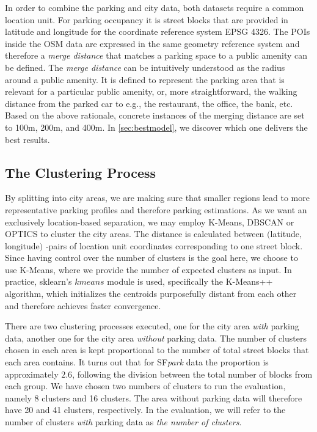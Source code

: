	In order to combine the parking and city data, both datasets require a common location unit. For parking occupancy it is street blocks that are provided in latitude and longitude for the coordinate reference system EPSG 4326. The POIs inside the OSM data are expressed in the same geometry reference system and therefore a \textit{merge distance} that matches a parking space to a public amenity can be defined. The \textit{merge distance} can be intuitively understood as the radius around a public amenity. It is defined to represent the parking area that is relevant for a particular public amenity, or, more straightforward, the walking distance from the parked car to e.g., the restaurant, the office, the bank, etc. Based on the above rationale, concrete instances of the merging distance are set to 100m, 200m, and 400m. In \cref{sec:bestmodel}, we discover which one delivers the best results.
	
	
	\subsection{The Clustering Process}
	By splitting into city areas, we are making sure that smaller regions lead to more representative parking profiles and therefore parking estimations. As we want an exclusively location-based separation, we may employ K-Means, DBSCAN or OPTICS to cluster the city areas. The distance is calculated between $($latitude$,$ longitude$)$ -pairs of location unit coordinates corresponding to one street block. Since having control over the number of clusters is the goal here, we choose to use K-Means, where we provide the number of expected clusters as input.  In practice, sklearn's $kmeans$ module is used, specifically the K-Means++ algorithm, which initializes the centroids purposefully distant from each other and therefore achieves faster convergence.
	
	There are two clustering processes executed, one for the city area \textit{with} parking data, another one for the city area \textit{without} parking data. The number of clusters chosen in each area is kept proportional to the number of total street blocks that each area contains. It turns out that for SF\textit{park} data the proportion is approximately $2.6$, following the division between the total number of blocks from each group. We have chosen two numbers of clusters to run the evaluation, namely 8 clusters and 16 clusters. The area without parking data will therefore have 20 and 41 clusters, respectively. In the evaluation, we will refer to the number of clusters \textit{with} parking data as \textit{the number of clusters}.	
	
